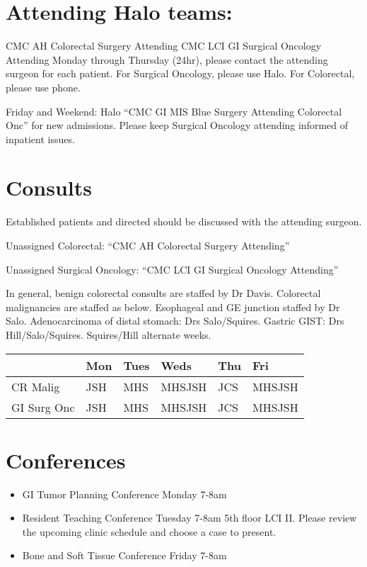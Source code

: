 \documentclass[
]{book}
\providecommand{\tightlist}{%
  \setlength{\itemsep}{0pt}\setlength{\parskip}{0pt}}
\begin{document}
\hypertarget{attending-halo-teams}{%
\section{Attending Halo teams:}\label{attending-halo-teams}}

CMC AH Colorectal Surgery Attending
CMC LCI GI Surgical Oncology Attending
Monday through Thursday (24hr), please contact the attending surgeon for each patient. For Surgical Oncology, please use Halo. For Colorectal, please use phone.

Friday and Weekend: Halo ``CMC GI MIS Blue Surgery Attending Colorectal Onc'' for new admissions. Please keep Surgical Oncology attending informed of inpatient issues.

\hypertarget{consults}{%
\section{Consults}\label{consults}}

Established patients and directed should be discussed with the attending surgeon.

Unassigned Colorectal: ``CMC AH Colorectal Surgery Attending''

Unassigned Surgical Oncology: ``CMC LCI GI Surgical Oncology Attending''

In general, benign colorectal consults are staffed by Dr Davis. Colorectal malignancies are staffed as below. Esophageal and GE junction staffed by Dr Salo. Adenocarcinoma of distal stomach: Drs Salo/Squires. Gastric GIST: Drs Hill/Salo/Squires. Squires/Hill alternate weeks.

\begin{longtable}[]{@{}llllll@{}}
\toprule
& Mon & Tues & Weds & Thu & Fri \\
\midrule
\endhead
CR Malig & JSH & MHS & MHSJSH & JCS & MHSJSH \\
GI Surg Onc & JSH & MHS & MHSJSH & JCS & MHSJSH \\
\bottomrule
\end{longtable}

\hypertarget{conferences}{%
\section{Conferences}\label{conferences}}

\begin{itemize}
\tightlist
\item
  GI Tumor Planning Conference Monday 7-8am
\item
  Resident Teaching Conference Tuesday 7-8am 5th floor LCI II. Please review the upcoming clinic schedule and choose a case to present.
\item
  Bone and Soft Tissue Conference Friday 7-8am
\end{itemize}
\end{document}
